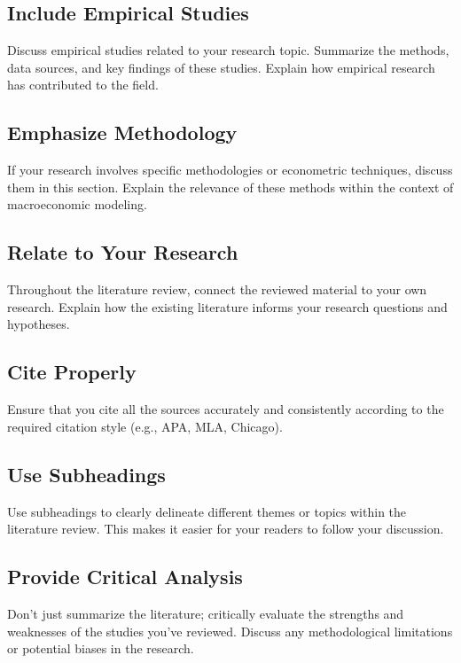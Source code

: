 \documentclass[../thesis.tex]{subfiles}
\begin{document}
	\begin{tcolorbox}[colback=red!5!white,colframe=red!75!black]
	
	\subsection{Include Empirical Studies}
	Discuss empirical studies related to your research topic. Summarize the methods, data sources, and key findings of these studies. Explain how empirical research has contributed to the field.
	
	\subsection{Emphasize Methodology}
	If your research involves specific methodologies or econometric techniques, discuss them in this section. Explain the relevance of these methods within the context of macroeconomic modeling.
	
	\subsection{Relate to Your Research}
	Throughout the literature review, connect the reviewed material to your own research. Explain how the existing literature informs your research questions and hypotheses.
	
	\subsection{Cite Properly}
	Ensure that you cite all the sources accurately and consistently according to the required citation style (e.g., APA, MLA, Chicago).
	
	\subsection{Use Subheadings}
	Use subheadings to clearly delineate different themes or topics within the literature review. This makes it easier for your readers to follow your discussion.
	
	\subsection{Provide Critical Analysis}
	Don't just summarize the literature; critically evaluate the strengths and weaknesses of the studies you've reviewed. Discuss any methodological limitations or potential biases in the research.

	\end{tcolorbox}
\end{document}
